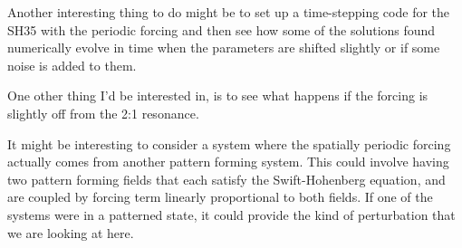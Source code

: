 \documentclass[api,pof,pre,12pt,a4paper]{revtex4-1}
\begin{document}
Another interesting thing to do might be to set up a time-stepping code for the SH35 with the periodic forcing and then see how some of the solutions found numerically evolve in time when the parameters are shifted slightly or if some noise is added to them.  

One other thing I'd be interested in, is to see what happens if the forcing is slightly off from the 2:1 resonance. 

It might be interesting to consider a system where the spatially periodic forcing actually comes from another pattern forming system.  This could involve having two pattern forming fields that each satisfy the Swift-Hohenberg equation, and are coupled  by  forcing term linearly proportional to both fields.  If one of the systems were in a patterned state, it could provide the kind of perturbation that we are looking at here.
    




\end{document}
